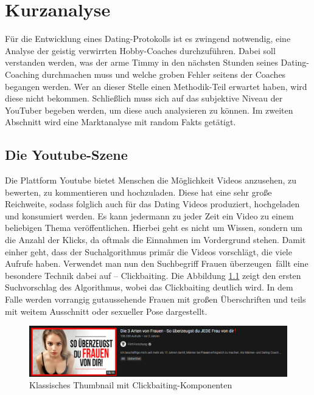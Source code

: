 \chapter{Kurzanalyse}
\label{chapter-analyse}

Für die Entwicklung eines Dating-Protokolls ist es zwingend notwendig, eine Analyse der geistig verwirrten Hobby-Coaches durchzuführen.
Dabei soll verstanden werden, was der arme Timmy in den nächsten Stunden seines Dating-Coaching durchmachen muss und welche groben Fehler seitens der Coaches begangen werden.
Wer an dieser Stelle einen Methodik-Teil erwartet haben, wird diese nicht bekommen.
Schließlich muss sich auf das subjektive Niveau der YouTuber begeben werden, um diese auch analysieren zu können.
Im zweiten Abschnitt wird eine Marktanalyse mit random Fakts getätigt.

\section{Die Youtube-Szene}
\label{chapter-analyse-yt}

Die Plattform Youtube bietet Menschen die Möglichkeit Videos anzusehen, zu bewerten, zu kommentieren und hochzuladen. 
Diese hat eine sehr große Reichweite, sodass folglich auch für das Dating Videos produziert, hochgeladen und konsumiert werden.
Es kann jedermann zu jeder Zeit ein Video zu einem beliebigen Thema veröffentlichen.
Hierbei geht es nicht um Wissen, sondern um die Anzahl der Klicks, da oftmals die Einnahmen im Vordergrund stehen.
Damit einher geht, dass der Suchalgorithmus primär die Videos vorschlägt, die viele Aufrufe haben.
Verwendet man nun den Suchbegriff \glqq Frauen überzeugen\grqq~fällt eine besondere Technik dabei auf – Clickbaiting.
Die Abbildung \ref{fig:analyse-clickbait} zeigt den ersten Suchvorschlag des Algorithmus, wobei das Clickbaiting deutlich wird.
In dem Falle werden vorrangig gutaussehende Frauen mit großen Überschriften und teils mit weitem Ausschnitt oder sexueller Pose dargestellt. 

\begin{figure}[h]
    \centering
    \includegraphics[scale=0.4]{Sources/clickbait.png}
    \caption{Klassisches Thumbnail mit Clickbaiting-Komponenten \cite{royalflushseduction}}
    \label{fig:analyse-clickbait}
\end{figure}

